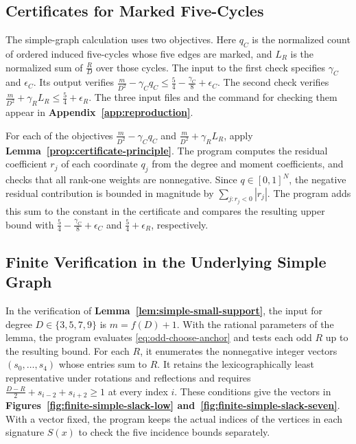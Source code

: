 \documentclass[preprint,11pt,numbers]{elsarticle-arxiv}
\numberwithin{equation}{section}
\theoremstyle{definition}
\begin{document}
\subsection{Certificates for Marked Five-Cycles}
\label{app:cycle-estimates}\label{sec:odd}

The simple-graph calculation uses two objectives. Here $q_C$ is
the normalized count of ordered induced five-cycles
whose five edges are marked, and $L_R$ is the normalized sum of
$\frac{R}{D}$ over those cycles. The input to the first check specifies
$\gamma_C$ and $\epsilon_C$. Its output verifies
$\frac{m}{D^2}-\gamma_Cq_C\leq\frac{5}{4}-\frac{\gamma_C}{8}+\epsilon_C$.
The second check verifies
$\frac{m}{D^2}+\gamma_RL_R\leq\frac{5}{4}+\epsilon_R$.
The three input files and the command for checking them appear in
\textbf{Appendix~\ref{app:reproduction}}.

For each of the objectives $\frac{m}{D^2}-\gamma_C q_C$ and
$\frac{m}{D^2}+\gamma_R L_R$, apply
\textbf{Lemma~\ref{prop:certificate-principle}}. The program computes
the residual coefficient $r_j$ of each coordinate $q_j$ from the
degree and moment coefficients, and checks that all rank-one weights
are nonnegative. Since $q\in[0,1]^N$, the negative residual
contribution is bounded in magnitude by $\sum_{j:r_j<0}|r_j|$.
The program adds this sum to the constant in the certificate and
compares the resulting upper bound with
$\frac{5}{4}-\frac{\gamma_C}{8}+\epsilon_C$ and
$\frac{5}{4}+\epsilon_R$, respectively.
\relax\space%
\subsection{Finite Verification in the Underlying Simple Graph}\label{app:odd-small}

In the verification of \textbf{Lemma~\ref{lem:simple-small-support}},
the input for degree $D\in\{3,5,7,9\}$ is $m=f(D)+1$.
With the rational parameters of the lemma, the program evaluates
\eqref{eq:odd-choose-anchor} and tests each odd $R$ up to the resulting
bound. For each $R$, it enumerates the nonnegative integer vectors
$(s_0,\ldots,s_4)$ whose entries sum to $R$. It retains the
lexicographically least representative under rotations and reflections
and requires $\frac{D-R}{2}+s_{i-2}+s_{i+2}\geq1$ at every index
$i$. These conditions give the vectors in
\textbf{Figures~\ref{fig:finite-simple-slack-low}
and~\ref{fig:finite-simple-slack-seven}}. With a vector fixed, the
program keeps the actual indices of the vertices in each signature
$S(x)$ to check the five incidence bounds separately.
\end{document}
